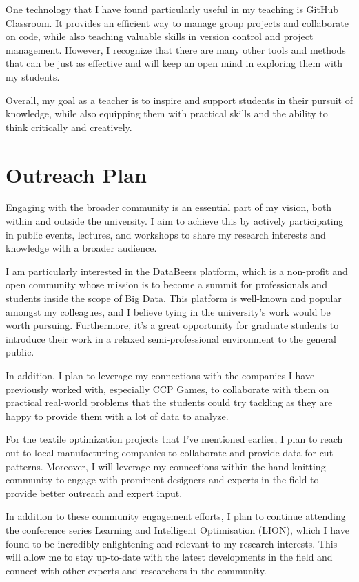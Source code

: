 \documentclass[]{cv} %
\begin{document}
One technology that I have found particularly useful in my teaching is GitHub Classroom. It provides an efficient way to manage group projects and collaborate on code, while also teaching valuable skills in version control and project management. However, I recognize that there are many other tools and methods that can be just as effective and will keep an open mind in exploring them with my students.

Overall, my goal as a teacher is to inspire and support students in their pursuit of knowledge, while also equipping them with practical skills and the ability to think critically and creatively.


\section{Outreach Plan}
Engaging with the broader community is an essential part of my vision, both within and outside the university. I aim to achieve this by actively participating in public events, lectures, and workshops to share my research interests and knowledge with a broader audience.

I am particularly interested in the DataBeers platform, which is a non-profit and open community whose mission is to become a summit for professionals and students inside the scope of Big Data. This platform is well-known and popular amongst my colleagues, and I believe tying in the university's work would be worth pursuing. Furthermore, it's a great opportunity for graduate students to introduce their work in a relaxed semi-professional environment to the general public.

In addition, I plan to leverage my connections with the companies I have previously worked with, especially CCP Games, to collaborate with them on practical real-world problems that the students could try tackling as they are happy to provide them with a lot of data to analyze.

For the textile optimization projects that I've mentioned earlier, I plan to reach out to local manufacturing companies to collaborate and provide data for cut patterns. Moreover, I will leverage my connections within the hand-knitting community to engage with prominent designers and experts in the field to provide better outreach and expert input.

In addition to these community engagement efforts, I plan to continue attending the conference series Learning and Intelligent Optimisation (LION), which I have found to be incredibly enlightening and relevant to my research interests. This will allow me to stay up-to-date with the latest developments in the field and connect with other experts and researchers in the community.
\end{document}
